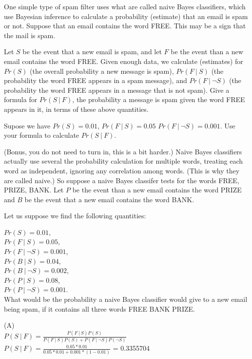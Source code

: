 \documentclass[solution,letterpaper]{cs20}
\begin{document}
    \begin{problem}
        \subproblem One simple type of spam filter uses what are called naive Bayes classifiers,
        which use Bayesian inference to calculate a probability (estimate)
        that an email is spam or not.  Suppose that an email contains the word
        FREE.  This may be a sign that the mail is spam.

        Let $S$ be the event that a new email is spam, and let $F$ be the event
        than a new email contains the word FREE.  Given enough data, we calculate
        (estimates) for $Pr(S)$ (the overall probability a new message is spam),
        $Pr(F~|~S)$ (the probability the word FREE appears in a spam message),
        and
        $Pr(F~|~\neg S)$ (the probability the word FREE appears in a message
        that is not spam).  Give a formula for
        $Pr(S~|~F)$, the probability a message is spam given the word FREE appears
        in it, in terms of these above quantities.

        Supose we have
        $Pr(S) = 0.01$,
        $Pr(F~|~S) = 0.05$
        $Pr(F~|~\neg S) = 0.001$.
        Use your formula to calculate $Pr(S~|~F)$.


        \subproblem
        (Bonus, you do not need to turn in, this is a bit harder.)  Naive Bayes classifiers actually use several the probability calculation for multiple words,
        treating each word as independent, ignoring any correlation among words.
        (This is why they are called naive.)
        So suppose a naive Bayes classifer tests for the words FREE, PRIZE, BANK.
        Let $P$ be the event than a new email contains the word PRIZE and $B$ be the event that a new email contains the word BANK.

        Let us suppose we find the following quantities:

        $Pr(S) = 0.01$, \\
        $Pr(F~|~S) = 0.05$, \\
        $Pr(F~|~\neg S) = 0.001$, \\
        $Pr(B~|~S) = 0.04$, \\
        $Pr(B~|~\neg S) = 0.002$, \\
        $Pr(P~|~S) = 0.08$, \\
        $Pr(P~|~\neg S) = 0.001$. \\

        What would be the probability a naive Bayes classifier would give to a new email
        being spam, if it contains all three words FREE BANK PRIZE.

        \begin{solution}
        (A) \\
        $P(S~|~F) = \frac{P(F~|~S)P(S)}{P(F~|~S)P(S) + P(F~|~\neg S)P(\neg S)}$ \\
        $P(S~|~F) = \frac{0.05 * 0.01}{0.05 * 0.01 + 0.001*(1-0.01)}$ = 0.3355704\\

        \end{solution}
    \end{problem}
    \newpage
\end{document}
